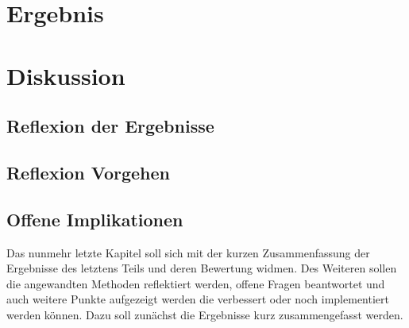 \documentclass[12pt, a4paper]{scrbook}
\begin{document}
\let\cleardoublepage\relax
\chapter{Ergebnis}

\let\cleardoublepage\relax
\chapter{Diskussion}
\section{Reflexion der Ergebnisse}
\section{Reflexion Vorgehen}
\section{Offene Implikationen}
Das nunmehr letzte Kapitel soll sich mit der kurzen Zusammenfassung der Ergebnisse des letztens Teils und deren Bewertung widmen. Des Weiteren sollen die angewandten Methoden reflektiert werden, offene Fragen beantwortet und auch weitere Punkte aufgezeigt werden die verbessert oder noch implementiert werden können. Dazu soll zunächst die Ergebnisse kurz zusammengefasst werden.

\let\cleardoublepage\relax
\pagestyle{empty}
\newpage
\pagestyle{empty}
\printbibheading
\printbibliography[type=book,heading=subbibliography,title={Literaturquellen}]
\printbibliography[type=misc,heading=subbibliography,title={Online Quellen}]
\pagestyle{empty}
\newpage
\pagestyle{empty}
\end{document}
